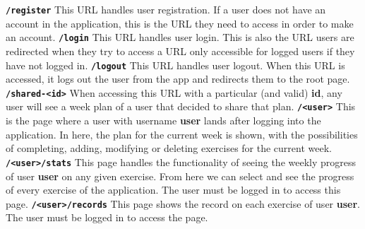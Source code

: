 \documentclass[12pt,twoside,titlepage,a4paper]{article}
\theoremstyle{definicion}
\theoremstyle{lema}
\theoremstyle{teorema}
\theoremstyle{corolario}
\theoremstyle{ejemplo}
\theoremstyle{nota}
\begin{document}
\texttt{\textbf{/register}}
\newline\newline
This URL handles user registration. If a user does not have an account in the application, this
is the URL they need to access in order to make an account.
\newline\newline
\texttt{\textbf{/login}}
\newline\newline
This URL handles user login. This is also the URL users are redirected when they try to access a
URL only accessible for logged users if they have not logged in.
\newpage
\texttt{\textbf{/logout}}
\newline\newline
This URL handles user logout. When this URL is accessed, it logs out the user from the app and redirects
them to the root page.
\newline\newline
\texttt{\textbf{/shared-<id>}}
\newline\newline
When accessing this URL with a particular (and valid) \textbf{id}, any user will see a week plan of a user
that decided to share that plan. 
\newline\newline
\texttt{\textbf{/<user>}}
\newline\newline
This is the page where a user with username \textbf{user} lands after logging into the application. In here, 
the plan for the current week is shown, with the possibilities of completing, adding, modifying or deleting
exercises for the current week.
\newline\newline
\texttt{\textbf{/<user>/stats}}
\newline\newline
This page handles the functionality of seeing the weekly progress of user \textbf{user} on any given exercise. 
From here we can select and see the progress of every exercise of the application. The user must be logged in 
to access this page.
\newline\newline
\texttt{\textbf{/<user>/records}}
\newline\newline
This page shows the record on each exercise of user \textbf{user}. The user must be logged in to access the page.
\newline\newline
\end{document}
